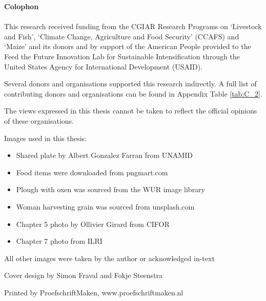 \thispagestyle{empty}
\vspace*{1cm}

{\Large\textbf{Colophon}}
\chaptermark{}
\\
\\
This research received funding from the CGIAR Research Programs on `Livestock and Fish', `Climate Change, Agriculture and Food Security' (CCAFS) and `Maize' and its donors and by support of the American People provided to the Feed the Future Innovation Lab for Sustainable Intensification through the United States Agency for International Development (USAID).

Several donors and organisations supported this research indirectly. A full list of contributing donors and organisations can be found in Appendix Table \ref{tab:C_2}.

The views expressed in this thesis cannot be taken to reflect the official opinions of these organisations.


Images used in this thesis:
\begin{itemize}
\item Shared plate by Albert Gonzalez Farran from UNAMID

\item Food items were downloaded from pngmart.com

\item Plough with oxen was sourced from the WUR image library

\item Woman harvesting grain was sourced from unsplash.com

\item Chapter 5 photo by Ollivier Girard from CIFOR 

\item Chapter 7 photo from ILRI
\end{itemize}


All other images were taken by the author or acknowledged in-text

\vspace*{\fill}
Cover design by Simon Fraval and Fokje Steenstra

Printed by ProefschriftMaken, www.proefschriftmaken.nl
